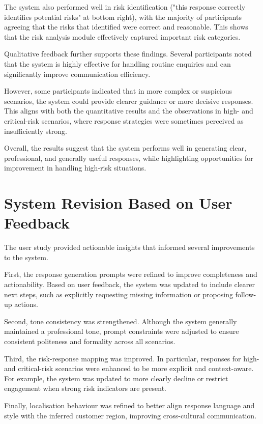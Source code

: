 \documentclass[12pt,a4paper]{report}
\begin{document}
The system also performed well in risk identification ("this response correctly identifies potential risks" at bottom right), with the majority of participants agreeing that the risks that identified were correct and reasonable. This shows that the risk analysis module effectively captured important risk categories.

Qualitative feedback further supports these findings. Several participants noted that the system is highly effective for handling routine enquiries and can significantly improve communication efficiency.

However, some participants indicated that in more complex or suspicious scenarios, the system could provide clearer guidance or more decisive responses. This aligns with both the quantitative results and the observations in high- and critical-risk scenarios, where response strategies were sometimes perceived as insufficiently strong.

Overall, the results suggest that the system performs well in generating clear, professional, and generally useful responses, while highlighting opportunities for improvement in handling high-risk situations.

\section{System Revision Based on User Feedback}

The user study provided actionable insights that informed several improvements to the system.

First, the response generation prompts were refined to improve completeness and actionability. Based on user feedback, the system was updated to include clearer next steps, such as explicitly requesting missing information or proposing follow-up actions.

Second, tone consistency was strengthened. Although the system generally maintained a professional tone, prompt constraints were adjusted to ensure consistent politeness and formality across all scenarios.

Third, the risk-response mapping was improved. In particular, responses for high- and critical-risk scenarios were enhanced to be more explicit and context-aware. For example, the system was updated to more clearly decline or restrict engagement when strong risk indicators are present.

Finally, localisation behaviour was refined to better align response language and style with the inferred customer region, improving cross-cultural communication.
\end{document}
